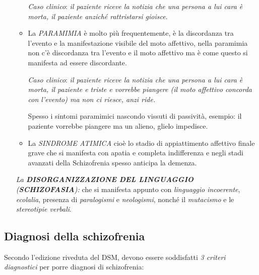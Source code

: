 \begin{itemize}
\begin{itemize}
\emph{Caso clinico}: \emph{il paziente riceve la notizia che una persona
a lui cara è morta, il paziente anziché rattristarsi gioisce}.

\item
  La \emph{PARAMIMIA} è molto più frequentemente, è la discordanza tra
  l'evento e la manifestazione visibile del moto affettivo, nella
  paramimia non c'è discordanza tra l'evento e il moto affettivo ma è
  come questo si manifesta ad essere discordante.

\emph{Caso clinico}: \emph{il paziente riceve la notizia che una persona
a lui cara è morta, il paziente e triste e vorrebbe piangere (il moto
affettivo concorda con l'evento) ma non ci riesce, anzi ride.}

Spesso i sintomi paramimici nascondo vissuti di passività, esempio: il
paziente vorrebbe piangere ma un alieno, glielo impedisce.

\item
  La \emph{SINDROME ATIMICA} cioè lo stadio di appiattimento affettivo
  finale grave che si manifesta con apatia e completa indifferenza e
  negli stadi avanzati della Schizofrenia spesso anticipa la demenza.
\end{itemize}

\emph{La \textbf{DISORGANIZZAZIONE DEL LINGUAGGIO}
(\textbf{SCHIZOFASIA}):} che si manifesta appunto con \emph{linguaggio
incoerente}, \emph{ecolalia}, presenza di \emph{paralogismi} e
\emph{neologismi}, nonché il \emph{mutacismo} e le \emph{stereotipie
verbali}.

\end{itemize}

\subsection{Diagnosi della schizofrenia}

Secondo l'edizione riveduta del DSM, devono essere soddisfatti \emph{3
criteri diagnostici} per porre diagnosi di schizofrenia:


